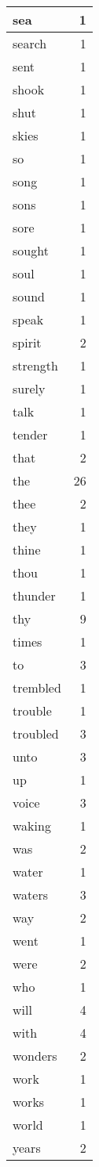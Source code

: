 \begin{center}
\begin{longtable}{l|r}
sea & 1\\ \hline 
search & 1\\ \hline 
sent & 1\\ \hline 
shook & 1\\ \hline 
shut & 1\\ \hline 
skies & 1\\ \hline 
so & 1\\ \hline 
song & 1\\ \hline 
sons & 1\\ \hline 
sore & 1\\ \hline 
sought & 1\\ \hline 
soul & 1\\ \hline 
sound & 1\\ \hline 
speak & 1\\ \hline 
spirit & 2\\ \hline 
strength & 1\\ \hline 
surely & 1\\ \hline 
talk & 1\\ \hline 
tender & 1\\ \hline 
that & 2\\ \hline 
the & 26\\ \hline 
thee & 2\\ \hline 
they & 1\\ \hline 
thine & 1\\ \hline 
thou & 1\\ \hline 
thunder & 1\\ \hline 
thy & 9\\ \hline 
times & 1\\ \hline 
to & 3\\ \hline 
trembled & 1\\ \hline 
trouble & 1\\ \hline 
troubled & 3\\ \hline 
unto & 3\\ \hline 
up & 1\\ \hline 
voice & 3\\ \hline 
waking & 1\\ \hline 
was & 2\\ \hline 
water & 1\\ \hline 
waters & 3\\ \hline 
way & 2\\ \hline 
went & 1\\ \hline 
were & 2\\ \hline 
who & 1\\ \hline 
will & 4\\ \hline 
with & 4\\ \hline 
wonders & 2\\ \hline 
work & 1\\ \hline 
works & 1\\ \hline 
world & 1\\ \hline 
years & 2\\ \hline 
\end{longtable}
\end{center}



